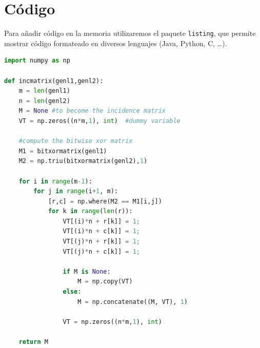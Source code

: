 \section{Código}
Para añadir código en la memoria utilizaremos el paquete \verb|listing|, que permite mostrar código formateado en diversos lenguajes (Java, Python, C, \ldots). 

\begin{lstlisting}[language=Python]
import numpy as np
    
def incmatrix(genl1,genl2):
    m = len(genl1)
    n = len(genl2)
    M = None #to become the incidence matrix
    VT = np.zeros((n*m,1), int)  #dummy variable
    
    #compute the bitwise xor matrix
    M1 = bitxormatrix(genl1)
    M2 = np.triu(bitxormatrix(genl2),1) 

    for i in range(m-1):
        for j in range(i+1, m):
            [r,c] = np.where(M2 == M1[i,j])
            for k in range(len(r)):
                VT[(i)*n + r[k]] = 1;
                VT[(i)*n + c[k]] = 1;
                VT[(j)*n + r[k]] = 1;
                VT[(j)*n + c[k]] = 1;
                
                if M is None:
                    M = np.copy(VT)
                else:
                    M = np.concatenate((M, VT), 1)
                
                VT = np.zeros((n*m,1), int)
    
    return M
\end{lstlisting}